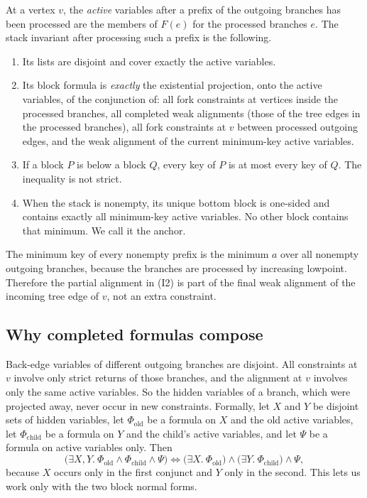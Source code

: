 \documentclass[11pt]{article}
\begin{document}
At a vertex $v$, the \emph{active} variables after a prefix of the outgoing
branches has been processed are the members of $F(e)$ for the processed
branches $e$. The stack invariant after processing such a prefix is the
following.
\begin{enumerate}[label=(I\arabic*),nosep]
\item Its lists are disjoint and cover exactly the active variables.
\item Its block formula is \emph{exactly} the existential projection, onto the
active variables, of the conjunction of: all fork constraints at vertices
inside the processed branches, all completed weak alignments (those of the
tree edges in the processed branches), all fork constraints at $v$ between
processed outgoing edges, and the weak alignment of the current minimum-key
active variables.
\item If a block $P$ is below a block $Q$, every key of $P$ is at most every key
of $Q$. The inequality is not strict.
\item When the stack is nonempty, its unique bottom block is one-sided and
contains exactly all minimum-key active variables. No other block contains that
minimum. We call it the anchor.
\end{enumerate}
The minimum key of every nonempty prefix is the minimum $a$ over all nonempty
outgoing branches, because the branches are processed by increasing lowpoint.
Therefore the partial alignment in (I2) is part of the final weak alignment of
the incoming tree edge of $v$, not an extra constraint.

\subsection*{Why completed formulas compose}

Back-edge variables of different outgoing branches are disjoint. All
constraints at $v$ involve only strict returns of those branches, and the
alignment at $v$ involves only the same active variables. So the hidden
variables of a branch, which were projected away, never occur in new
constraints. Formally, let $X$ and $Y$ be disjoint sets of hidden variables,
let $\Phi_{\mathrm{old}}$ be a formula on $X$ and the old active variables, let
$\Phi_{\mathrm{child}}$ be a formula on $Y$ and the child's active variables,
and let $\Psi$ be a formula on active variables only. Then
\begin{equation*}
\bigl(\exists X,Y.\ \Phi_{\mathrm{old}}\wedge\Phi_{\mathrm{child}}\wedge\Psi\bigr)
\iff
\bigl(\exists X.\ \Phi_{\mathrm{old}}\bigr)\wedge
\bigl(\exists Y.\ \Phi_{\mathrm{child}}\bigr)\wedge\Psi,
\end{equation*}
because $X$ occurs only in the first conjunct and $Y$ only in the second. This
lets us work only with the two block normal forms.
\end{document}
